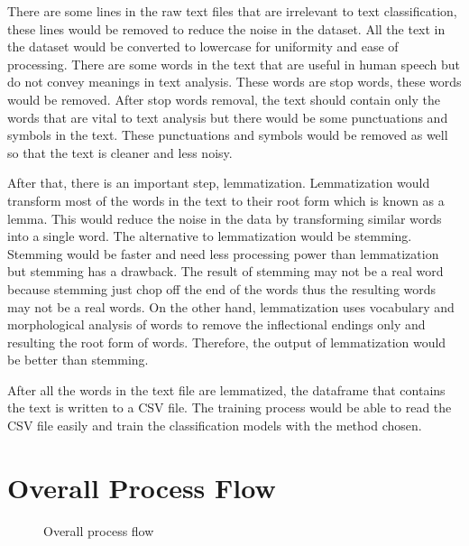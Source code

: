 There are some lines in the raw text files that are irrelevant to text classification, these lines would be removed to reduce the noise in the dataset. All the text in the dataset would be converted to lowercase for uniformity and ease of processing. There are some words in the text that are useful in human speech but do not convey meanings in text analysis. These words are stop words, these words would be removed. After stop words removal, the text should contain only the words that are vital to text analysis but there would be some punctuations and symbols in the text. These punctuations and symbols would be removed as well so that the text is cleaner and less noisy.

After that, there is an important step, lemmatization. Lemmatization would transform most of the words in the text to their root form which is known as a lemma. This would reduce the noise in the data by transforming similar words into a single word. The alternative to lemmatization would be stemming. Stemming would be faster and need less processing power than lemmatization but stemming has a drawback. The result of stemming may not be a real word because stemming just chop off the end of the words thus the resulting words may not be a real words. On the other hand, lemmatization uses vocabulary and morphological analysis of words to remove the inflectional endings only and resulting the root form of words. \cite{stemLemma} Therefore, the output of lemmatization would be better than stemming.

After all the words in the text file are lemmatized, the dataframe that contains the text is written to a CSV file. The training process would be able to read the CSV file easily and train the classification models with the method chosen.\\


\section{Overall Process Flow}
\begin{figure} [ht]
\centering
{}
\caption{Overall process flow}
\label{fig: overallFlow}
\end{figure}


